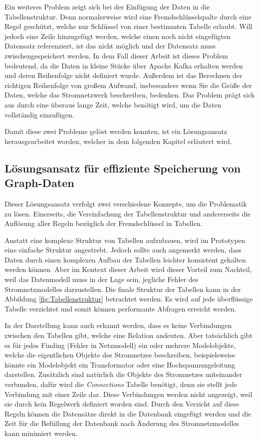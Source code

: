 Ein weiteres Problem zeigt sich bei der Einfügung der Daten in die Tabellenstruktur. Denn normalerweise wird eine Fremdschlüsselspalte durch eine Regel geschützt, welche nur Schlüssel von einer bestimmten Tabelle erlaubt. Will jedoch eine Zeile hinzugefügt werden, welche einen noch nicht eingefügten Datensatz referenziert, ist das nicht möglich und der Datensatz muss zwischengespeichert werden. In dem Fall dieser Arbeit ist dieses Problem bedeutend, da die Daten in kleine Stücke über Apache Kafka erhalten werden und deren Reihenfolge nicht definiert wurde. Außerdem ist das Berechnen der richtigen Reihenfolge von großem Aufwand, insbesondere wenn Sie die Größe der Daten, welche das Stromnetzwerk beschreiben, bedenken. Das Problem prägt sich aus durch eine überaus lange Zeit, welche benötigt wird, um die Daten vollständig einzufügen. 

Damit diese zwei Probleme gelöst werden konnten, ist ein Lösungsansatz herausgearbeitet worden, welcher in dem folgenden Kapitel erläutert wird.

\subsection{Lösungsansatz für effiziente Speicherung von Graph-Daten}

Dieser Lösungsansatz verfolgt zwei verschiedene Konzepte, um die Problematik zu lösen. Einerseits, die Vereinfachung der Tabellenstruktur und andererseits die Auflösung aller Regeln bezüglich der Fremdschlüssel in Tabellen. 

Anstatt eine komplexe Struktur von Tabellen aufzubauen, wird im Prototypen eine einfache Struktur angestrebt. Jedoch sollte auch angemerkt werden, dass Daten durch einen komplexen Aufbau der Tabellen leichter konsistent gehalten werden können. Aber im Kontext dieser Arbeit wird dieser Vorteil zum Nachteil, weil das Datenmodell muss in der Lage sein, jegliche Fehler des Stromnetzmodelles darzustellen. Die finale Struktur der Tabellen kann in der Abbildung \ref{fig:Tabellenstruktur} betrachtet werden. Es wird auf jede überflüssige Tabelle verzichtet und somit können performante Abfragen erreicht werden. 

In der Darstellung kann auch erkannt werden, dass es keine Verbindungen zwischen den Tabellen gibt, welche eine Relation andeuten. Aber tatsächlich gibt es für jedes Finding (Fehler in Netzmodell) ein oder mehrere Modelobjekte, welche die eigentlichen Objekte des Stromnetzes beschreiben, beispielsweise könnte ein Modelobjekt ein Transformator oder eine Hochspannungsleitung darstellen. Zusätzlich sind natürlich die Objekte des Stromnetzes miteinander verbunden, dafür wird die \emph{Connections} Tabelle benötigt, denn sie stellt jede Verbindung mit einer Zeile dar. Diese Verbindungen werden nicht angezeigt, weil sie durch kein Regelwerk definiert worden sind. Durch den Verzicht auf diese Regeln können die Datensätze direkt in die Datenbank eingefügt werden und die Zeit für die Befüllung der Datenbank nach Änderung des Stromnetzmodelles kann minimiert werden.   

